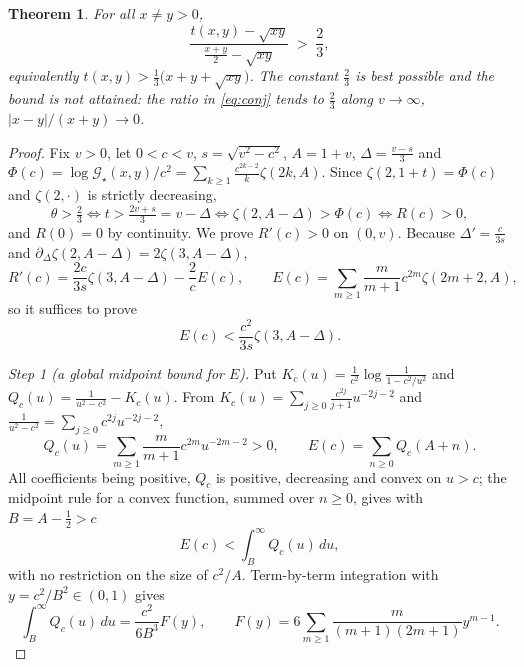 \documentclass[11pt,a4paper]{amsart}
\newtheorem{theorem}{Theorem}[section]
\theoremstyle{definition}
\newcommand{\Gs}{\mathcal{G}_{\star}}
\begin{document}
\begin{theorem}\label{conj:sharp}
For all $x\ne y>0$,
\begin{equation}\label{eq:conj}
  \frac{t(x,y)-\sqrt{xy}}{\frac{x+y}{2}-\sqrt{xy}}\;>\;\frac{2}{3},
\end{equation}
equivalently $t(x,y)>\frac13\big(x+y+\sqrt{xy}\big)$. The constant $\frac23$ is best
possible and the bound is not attained: the ratio in \eqref{eq:conj} tends to $\frac23$
along $v\to\infty$, $|x-y|/(x+y)\to0$.
\end{theorem}

\begin{proof}
Fix $v>0$, let $0<c<v$, $s=\sqrt{v^{2}-c^{2}}$, $A=1+v$, $\Delta=\frac{v-s}{3}$ and
$\Phi(c)=\log\Gs(x,y)/c^{2}=\sum_{k\ge1}\frac{c^{2k-2}}{k}\zeta(2k,A)$. Since
$\zeta(2,1+t)=\Phi(c)$ and $\zeta(2,\cdot)$ is strictly decreasing,
\[
  \theta>\tfrac23\iff t>\tfrac{2v+s}{3}=v-\Delta
  \iff\zeta(2,A-\Delta)>\Phi(c)\iff R(c)>0 ,
\]
and $R(0)=0$ by continuity. We prove $R'(c)>0$ on $(0,v)$. Because
$\Delta'=\frac{c}{3s}$ and $\partial_{\Delta}\zeta(2,A-\Delta)=2\zeta(3,A-\Delta)$,
\begin{equation}\label{eq:Rp}
  R'(c)=\frac{2c}{3s}\zeta(3,A-\Delta)-\frac{2}{c}E(c),\qquad
  E(c)=\sum_{m\ge1}\frac{m}{m+1}c^{2m}\zeta(2m+2,A),
\end{equation}
so it suffices to prove
\begin{equation}\label{eq:target}
  E(c)<\frac{c^{2}}{3s}\zeta(3,A-\Delta).
\end{equation}

\emph{Step 1 (a global midpoint bound for $E$).} Put
$K_c(u)=\frac{1}{c^{2}}\log\frac{1}{1-c^{2}/u^{2}}$ and
$Q_c(u)=\frac{1}{u^{2}-c^{2}}-K_c(u)$. From
$K_c(u)=\sum_{j\ge0}\frac{c^{2j}}{j+1}u^{-2j-2}$ and
$\frac{1}{u^{2}-c^{2}}=\sum_{j\ge0}c^{2j}u^{-2j-2}$,
\[
  Q_c(u)=\sum_{m\ge1}\frac{m}{m+1}c^{2m}u^{-2m-2}>0,\qquad E(c)=\sum_{n\ge0}Q_c(A+n).
\]
All coefficients being positive, $Q_c$ is positive, decreasing and convex on $u>c$; the
midpoint rule for a convex function, summed over $n\ge0$, gives with $B=A-\frac12>c$
\begin{equation}\label{eq:mid}
  E(c)<\int_{B}^{\infty}Q_c(u)\,du ,
\end{equation}
with no restriction on the size of $c^{2}/A$. Term-by-term integration with
$y=c^{2}/B^{2}\in(0,1)$ gives
\begin{equation}\label{eq:F}
  \int_{B}^{\infty}Q_c(u)\,du=\frac{c^{2}}{6B^{3}}F(y),\qquad
  F(y)=6\sum_{m\ge1}\frac{m}{(m+1)(2m+1)}y^{m-1}.
\end{equation}


\end{proof}
\end{document}
